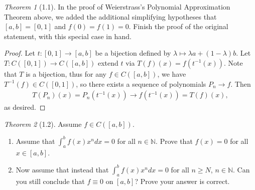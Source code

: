 \documentclass[12pt]{article}
\theoremstyle{remark}
\theoremstyle{named}
\newtheorem*{theorem}{Theorem}
\newcommand{\N}{\mathbb N}
\begin{document}
\begin{theorem}[1.1]
    In the proof of Weierstrass's Polynomial Approximation Theorem above, we added the additional simplifying hypotheses that \([a, b] = [0, 1]\) and \(f(0) = f(1) = 0\). Finish the proof of the original statement, with this special case in hand.
\end{theorem}

\begin{proof}
    Let \(t : [0, 1] \to [a, b]\) be a bijection defined by \(\lambda \mapsto \lambda a + (1 - \lambda) b\). Let \(T : C([0, 1]) \to C([a, b])\) extend \(t\) via \(T(f)(x) = f(t^{-1}(x))\). Note that \(T\) is a bijection, thus for any \(f \in C([a, b])\), we have \(T^{-1}(f) \in C([0, 1])\), so there exists a sequence of polynomials \(P_n \to f\). Then 
    \begin{align*}
        T(P_n)(x) = P_n(t^{-1}(x)) \to f(t^{-1}(x)) = T(f)(x),
    \end{align*}
    as desired.
\end{proof}

\begin{theorem}[1.2]
    Assume \(f \in C([a, b])\).
    \begin{enumerate}
        \item Assume that \(\int_{a}^{b} f(x) x^n dx = 0\) for all \(n \in \N\). Prove that \(f(x) = 0\) for all \(x \in [a, b]\).

        \item Now assume that instead that \(\int_{a}^{b} f(x) x^n dx = 0\) for all \(n \geq N\), \(n \in \N\). Can you still conclude that \(f \equiv 0\) on \([a, b]\)? Prove your answer is correct.
    \end{enumerate}
\end{theorem}
\end{document}
